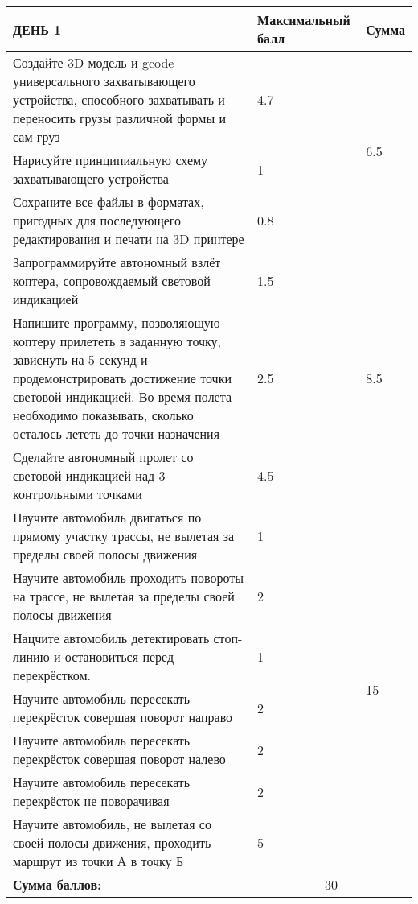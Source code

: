 \begin{longtable}{|p{8.5cm}|p{3.5cm}|p{1.5cm}|}
    \hline
    ДЕНЬ 1 & Максимальный балл & Сумма \\
    \hline
    Создайте 3D модель и gcode универсального захватывающего устройства, способного захватывать и переносить грузы различной формы и сам груз & 4.7 & \multirow{3}{*}{6.5} \\ 
    \cline{1-2}
    Нарисуйте принципиальную схему захватывающего устройства & 1 & \\ 
    \cline{1-2}
    Сохраните все файлы в форматах, пригодных для последующего редактирования и печати на 3D принтере & 0.8 & \\
    \hline
    Запрограммируйте автономный взлёт коптера, сопровождаемый световой индикацией & 1.5 & \multirow{3}{*}{8.5} \\ 
    \cline{1-2}
    Напишите программу, позволяющую коптеру прилететь в заданную точку, зависнуть на 5 секунд и продемонстрировать достижение точки световой индикацией. Во время полета необходимо показывать, сколько осталось лететь до точки назначения & 2.5 & \\ 
    \cline{1-2}
    Сделайте автономный пролет со световой индикацией над 3 контрольными точками & 4.5 & \\ 
    \hline
    Научите автомобиль двигаться по прямому участку трассы, не вылетая за пределы своей полосы движения & 1 & \multirow{7}{*}{15} \\ 
    \cline{1-2}
    Научите автомобиль проходить повороты на трассе, не вылетая за пределы своей полосы движения & 2 & \\ 
    \cline{1-2}
    Нацчите автомобиль детектировать стоп-линию и остановиться перед перекрёстком. & 1 & \\ 
    \cline{1-2}
    Научите автомобиль пересекать перекрёсток совершая поворот направо & 2 & \\ 
    \cline{1-2}
    Научите автомобиль пересекать перекрёсток совершая поворот налево & 2 & \\ 
    \cline{1-2}
    Научите автомобиль пересекать перекрёсток не поворачивая & 2 & \\ 
    \cline{1-2}
    Научите автомобиль, не вылетая со своей полосы движения, проходить маршрут из точки А в точку Б & 5 & \\ 
    \hline
    \textbf{Сумма баллов:} & \multicolumn{2}{|c|}{30} \\
    \hline
\end{longtable}


